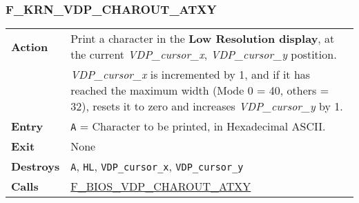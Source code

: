     \subsubsection{F\_KRN\_VDP\_CHAROUT\_ATXY}
    \label{func:fkrnvdpcharoutatxy}
    \begin{tabular}{l p{15cm}}
        \hline\textbf{Action}
        & Print a character in the \textbf{Low Resolution display}, at the
            current \textit{VDP\_cursor\_x}, \textit{VDP\_cursor\_y} postition.\\
        & \textit{VDP\_cursor\_x} is incremented by 1, and if it has reached
            the maximum width (Mode 0 = 40, others = 32), resets it to zero and
            increases \textit{VDP\_cursor\_y} by 1.\\
        \hline\textbf{Entry} & \texttt{A} = Character to be printed, in
            Hexadecimal ASCII.\\
        \hline\textbf{Exit} & None\\
        \hline\textbf{Destroys} & \texttt{A}, \texttt{HL},
        \texttt{VDP\_cursor\_x}, \texttt{VDP\_cursor\_y}\\
        \hline\textbf{Calls}
        & \hyperref[func:fbiosvdpcharoutatxy]{F\_BIOS\_VDP\_CHAROUT\_ATXY}\\
        \hline
    \end{tabular}